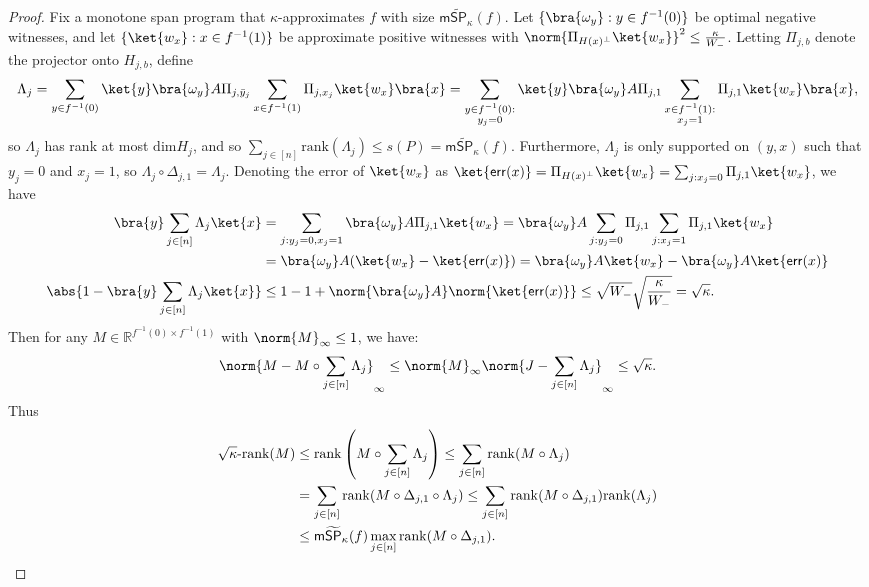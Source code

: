 \documentclass[11pt]{article}
\numberwithin{equation}{section}
\theoremstyle{definition}
\theoremstyle{plain}
\newcommand{\R}{\mathbb R}
\begin{document}
\begin{proof}
Fix a monotone span program that $\kappa$-approximates $f$ with size $\mathsf{m}\widetilde{\mathsf{SP}}_\kappa(f)$. Let $\{\bra{\omega_y}: y\in f^{-1}(0)\}$ be optimal negative witnesses, and let $\{\ket{w_x}:x\in f^{-1}(1)\}$ be approximate positive witnesses with $\norm{\Pi_{H(x)^\bot}\ket{w_x}}^2\leq \frac{\kappa}{W_-}$. Letting $\Pi_{j,b}$ denote the projector onto $H_{j,b}$, define 
$$\Lambda_j=\sum_{y\in f^{-1}(0)}\ket{y}\bra{\omega_y}A\Pi_{j,\bar{y}_j}\sum_{x\in f^{-1}(1)}\Pi_{j,x_j}\ket{w_x}\bra{x}
=\sum_{\substack{y\in f^{-1}(0):\\ y_j=0}}\ket{y}\bra{\omega_y}A\Pi_{j,1}\sum_{\substack{x\in f^{-1}(1):\\ x_j=1}}\Pi_{j,1}\ket{w_x}\bra{x},$$
so $\Lambda_j$ has rank at most $\mathrm{dim}H_j$, and so $\sum_{j\in [n]}\mathrm{rank}(\Lambda_j)\leq s(P) = \mathsf{m}\widetilde{\mathsf{SP}}_\kappa(f)$. Furthermore, $\Lambda_j$ is only supported on $(y,x)$ such that $y_j=0$ and $x_j=1$, so $\Lambda_j\circ \Delta_{j,1}=\Lambda_j$. Denoting the error of $\ket{w_x}$ as $\ket{\mathsf{err}(x)}=\Pi_{H(x)^\bot}\ket{w_x}=\sum_{j:x_j=0}\Pi_{j,1}\ket{w_x}$, we have
\begin{align*}
\bra{y}\sum_{j\in [n]}\Lambda_j\ket{x} &= \sum_{j:y_j=0,x_j=1}\bra{\omega_y} A\Pi_{j,1}\ket{w_x}
=\bra{\omega_y}A\sum_{j:y_j=0}\Pi_{j,1}\sum_{j:x_j=1}\Pi_{j,1}\ket{w_x}\\
&=\bra{\omega_y}A(\ket{w_x}-\ket{\mathsf{err}(x)})
=\bra{\omega_y}A\ket{w_x}-\bra{\omega_y}A\ket{\mathsf{err}(x)}\\
\abs{1-\bra{y}\sum_{j\in [n]}\Lambda_j\ket{x}}&\leq 1-1+\norm{\bra{\omega_y}A}\norm{\ket{\mathsf{err}(x)}} \leq \sqrt{W_-}\sqrt{\frac{\kappa}{W_-}}=\sqrt{\kappa}.
\end{align*}
Then for any $M\in \R^{f^{-1}(0)\times f^{-1}(1)}$ with $\norm{M}_\infty\leq 1$, we have:
$$\norm{M-M\circ \sum_{j\in[n]}\Lambda_j}_\infty\leq \norm{M}_\infty\norm{J-\sum_{j\in [n]}\Lambda_j}_\infty\leq \sqrt{\kappa}.$$
Thus
\begin{align*}
\sqrt{\kappa}\mbox{-rank}(M) &\leq  \mathrm{rank}\left(M\circ \sum_{j\in [n]}\Lambda_j\right)\leq \sum_{j\in [n]}\mathrm{rank}(M\circ\Lambda_j)\\
&= \sum_{j\in [n]}\mathrm{rank}(M\circ \Delta_{j,1}\circ\Lambda_j) \leq \sum_{j\in [n]}\mathrm{rank}(M\circ \Delta_{j,1})\mathrm{rank}(\Lambda_j)\\
&\leq  \mathsf{m}\widetilde{\mathsf{SP}}_\kappa(f)\max_{j\in [n]}\mathrm{rank}(M\circ\Delta_{j,1}).\qedhere
\end{align*}
\end{proof}
\end{document}
